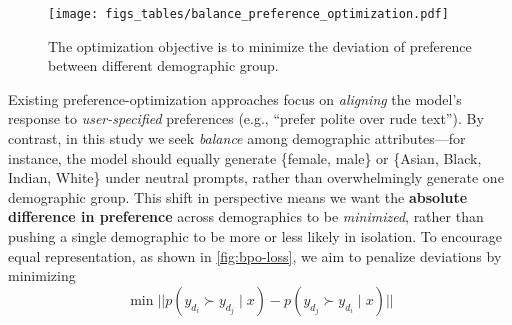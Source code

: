 \begin{figure*}[ht]
    \centering
    \vspace{-0.25cm}
    \texttt{[image: figs\_tables/balance\_preference\_optimization.pdf]}
    \vspace{-0.5cm}
    \caption{The optimization objective is to minimize the deviation of preference between different demographic group.}
    \vspace{-0.5cm}
    \label{fig:bpo-loss}
\end{figure*}




Existing preference-optimization approaches focus on \emph{aligning} the model’s response to \emph{user-specified} preferences (e.g., “prefer polite over rude text”). By contrast, in this study we seek \emph{balance} among demographic attributes---for instance, the model should equally generate \{female, male\} or \{Asian, Black, Indian, White\} under neutral prompts, rather than overwhelmingly generate one demographic group. This shift in perspective means we want the \textbf{absolute difference in preference} across demographics to be \emph{minimized}, rather than pushing a single demographic to be more or less likely in isolation. To encourage equal representation, as shown in \autoref{fig:bpo-loss}, we aim to penalize deviations by minimizing
\begin{equation}
\min ||p(y_{d_i} \succ y_{d_j} \mid x) -
p(y_{d_j} \succ y_{d_i} \mid x) ||
\end{equation}

